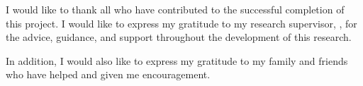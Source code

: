 
I would like to thank all who have contributed to the successful completion of
this project. I would like to express my gratitude to my research supervisor,
\xmumSupervisor, for the advice, guidance, and support throughout the
development of this research.

\vspace{\baselineskip}

In addition, I would also like to express my gratitude to my family and friends
who have helped and given me encouragement.

